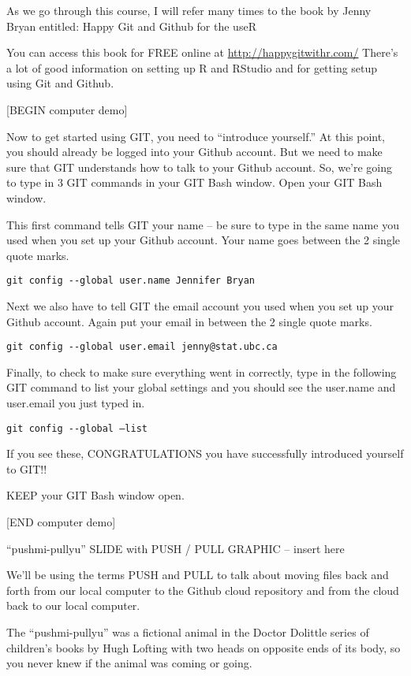 \documentclass[
]{book}
\begin{document}
As we go through this course, I will refer many times to the book by Jenny Bryan entitled: Happy Git and Github for the useR

You can access this book for FREE online at \url{http://happygitwithr.com/} There's a lot of good information on setting up R and RStudio and for getting setup using Git and Github.

{[}BEGIN computer demo{]}

Now to get started using GIT, you need to ``introduce yourself.'' At this point, you should already be logged into your Github account. But we need to make sure that GIT understands how to talk to your Github account. So, we're going to type in 3 GIT commands in your GIT Bash window. Open your GIT Bash window.

This first command tells GIT your name -- be sure to type in the same name you used when you set up your Github account. Your name goes between the 2 single quote marks.

\texttt{git\ config\ -\/-global\ user.name\ \textquotesingle{}Jennifer\ Bryan\textquotesingle{}}

Next we also have to tell GIT the email account you used when you set up your Github account. Again put your email in between the 2 single quote marks.

\texttt{git\ config\ -\/-global\ user.email\ \textquotesingle{}jenny@stat.ubc.ca\textquotesingle{}}

Finally, to check to make sure everything went in correctly, type in the following GIT command to list your global settings and you should see the user.name and user.email you just typed in.

\texttt{git\ config\ -\/-global\ –list}

If you see these, CONGRATULATIONS you have successfully introduced yourself to GIT!!

KEEP your GIT Bash window open.

{[}END computer demo{]}

``pushmi-pullyu'' SLIDE with PUSH / PULL GRAPHIC -- insert here

We'll be using the terms PUSH and PULL to talk about moving files back and forth from our local computer to the Github cloud repository and from the cloud back to our local computer.

The ``pushmi-pullyu'' was a fictional animal in the Doctor Dolittle series of children's books by Hugh Lofting with two heads on opposite ends of its body, so you never knew if the animal was coming or going.
\end{document}

